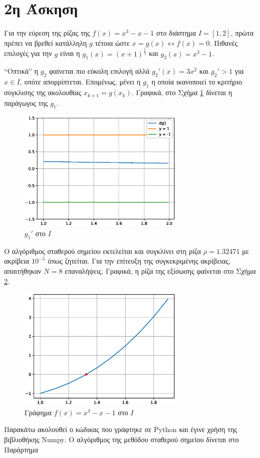 \documentclass[assignment2.tex]{subfiles}
\begin{document}
\section*{2η Άσκηση}
Για την εύρεση της ρίζας της $f(x)=x^3-x-1$ στο διάστημα $I=[1,2]$, πρώτα πρέπει να βρεθεί κατάλληλη $g$ τέτοια ώστε $x=g(x) \leftrightarrow f(x)=0$. Πιθανές επιλογές για την $g$ είναι η $g_1(x)=\left(x+1\right)^{\frac{1}{3}}$ και $g_2(x)=x^3-1$. 

``Οπτικά'' η $g_2$ φαίνεται πιο εύκολη επιλογή αλλά $g_2'(x) = 3x^2$ και $g_2'>1$ για $x\in I$, οπότε απορρίπτεται. Επομένως, μένει η $g_1$ η οποία ικανοποιεί το κριτήριο σύγκλισης της ακολουθίας $x_{k+1}=g(x_k)$. Γραφικά, στο Σχήμα \ref{fig:dg2} δίνεται η παράγωγος της $g_1$.
\begin{figure}[hp]
	\includegraphics[width=0.7\textwidth]{dg2.eps}
	\centering
	\caption{$g_1'$ στο $I$}
	\label{fig:dg2}
\end{figure} 

Ο αλγόριθμος σταθερού σημείου εκτελείται και συγκλίνει στη ρίζα $\rho=1.32471$ με ακρίβεια $10^{-5}$ όπως ζητείται. Για την επίτευξη της συγκεκριμένης ακρίβειας, απαιτήθηκαν $N=8$ επαναλήψεις. Γραφικά, η ρίζα της εξίσωσης φαίνεται στο Σχήμα \ref{fig:f2}.
\begin{figure}[hp]
	\includegraphics[width=0.7\textwidth]{f2.eps}
	\centering
	\caption{Γράφημα $f(x)=x^3-x-1$ στο $I$}
	\label{fig:f2}
\end{figure}

Παρακάτω ακολουθεί ο κώδικας που γράφτηκε σε \textlatin{Python} και έγινε χρήση της βιβλιοθήκης \textlatin{Numpy}. Ο αλγόριθμος της μεθόδου σταθερού σημείου δίνεται στο Παράρτημα

\end{document}
